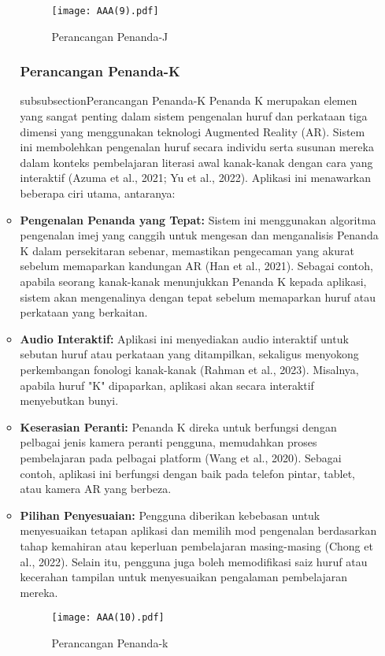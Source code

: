 \begin{itemize}
\begin{itemize}
\begin{figure}
    \centering
    \texttt{[image: AAA(9).pdf]}
    \caption{Perancangan Penanda-J}
    \label{fig:J}
\end{figure}
\clearpage

\subsubsection{Perancangan Penanda-K}

subsubsection{Perancangan Penanda-K}  
Penanda K merupakan elemen yang sangat penting dalam sistem pengenalan huruf dan perkataan tiga dimensi yang menggunakan teknologi Augmented Reality (AR). Sistem ini membolehkan pengenalan huruf secara individu serta susunan mereka dalam konteks pembelajaran literasi awal kanak-kanak dengan cara yang interaktif (Azuma et al., 2021; Yu et al., 2022). Aplikasi ini menawarkan beberapa ciri utama, antaranya:  \\ 

\item \textbf{Pengenalan Penanda yang Tepat:} Sistem ini menggunakan algoritma pengenalan imej yang canggih untuk mengesan dan menganalisis Penanda K dalam persekitaran sebenar, memastikan pengecaman yang akurat sebelum memaparkan kandungan AR (Han et al., 2021). Sebagai contoh, apabila seorang kanak-kanak menunjukkan Penanda K kepada aplikasi, sistem akan mengenalinya dengan tepat sebelum memaparkan huruf atau perkataan yang berkaitan.\\  
\item \textbf{Audio Interaktif:} Aplikasi ini menyediakan audio interaktif untuk sebutan huruf atau perkataan yang ditampilkan, sekaligus menyokong perkembangan fonologi kanak-kanak (Rahman et al., 2023). Misalnya, apabila huruf "K" dipaparkan, aplikasi akan secara interaktif menyebutkan bunyi.\\  
\item \textbf{Keserasian Peranti:} Penanda K direka untuk berfungsi dengan pelbagai jenis kamera peranti pengguna, memudahkan proses pembelajaran pada pelbagai platform (Wang et al., 2020). Sebagai contoh, aplikasi ini berfungsi dengan baik pada telefon pintar, tablet, atau kamera AR yang berbeza.\\  
\item \textbf{Pilihan Penyesuaian:} Pengguna diberikan kebebasan untuk menyesuaikan tetapan aplikasi dan memilih mod pengenalan berdasarkan tahap kemahiran atau keperluan pembelajaran masing-masing (Chong et al., 2022). Selain itu, pengguna juga boleh memodifikasi saiz huruf atau kecerahan tampilan untuk menyesuaikan pengalaman pembelajaran mereka.
\\
\begin{figure}
    \centering
    \texttt{[image: AAA(10).pdf]}
    \caption{Perancangan Penanda-k}
    \label{fig:J}
\end{figure}
\clearpage





\end{itemize}
\end{itemize}
